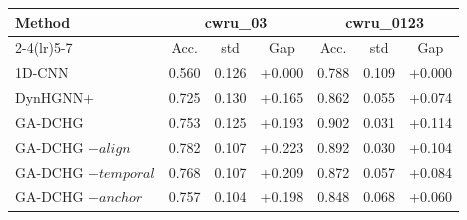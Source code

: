 \begin{tabular}{lcccccc}
\toprule
Method & \multicolumn{3}{c}{cwru\_03} & \multicolumn{3}{c}{cwru\_0123} \\
\cmidrule(lr){2-4}\cmidrule(lr){5-7}
 & Acc. & std & Gap & Acc. & std & Gap \\
\midrule
1D-CNN & 0.560 & 0.126 & +0.000 & 0.788 & 0.109 & +0.000 \\
DynHGNN+ & 0.725 & 0.130 & +0.165 & 0.862 & 0.055 & +0.074 \\
\midrule
GA-DCHG & 0.753 & 0.125 & +0.193 & 0.902 & 0.031 & +0.114 \\
GA-DCHG $-align$ & 0.782 & 0.107 & +0.223 & 0.892 & 0.030 & +0.104 \\
GA-DCHG $-temporal$ & 0.768 & 0.107 & +0.209 & 0.872 & 0.057 & +0.084 \\
GA-DCHG $-anchor$ & 0.757 & 0.104 & +0.198 & 0.848 & 0.068 & +0.060 \\
\bottomrule
\end{tabular}

